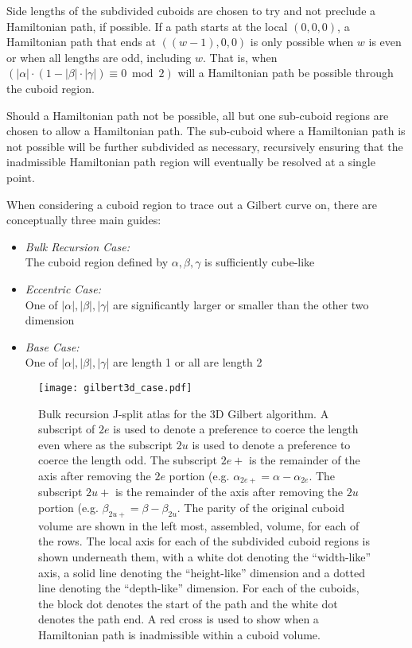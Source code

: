 Side lengths of the subdivided cuboids are chosen to try and not preclude a
Hamiltonian path, if possible.
If a path starts at the local $(0,0,0)$, a Hamiltonian path that ends
at $((w-1),0,0)$ is only possible when $w$ is even or when all lengths are odd, including $w$.
That is, when $(|\alpha| \cdot ( 1 - |\beta| \cdot |\gamma| ) \equiv 0 \bmod 2)$ will a Hamiltonian
path be possible through the cuboid region.

Should a Hamiltonian path not be possible, all but one sub-cuboid regions are chosen to allow a Hamiltonian
path.
The sub-cuboid where a Hamiltonian path is not possible will be further subdivided as necessary, recursively
ensuring that the inadmissible Hamiltonian path region will eventually be resolved at a single point.

When considering a cuboid region to trace out a Gilbert curve on, there are conceptually three main guides:

\begin{itemize}
  \item \textit{Bulk Recursion Case:} \\ The cuboid region defined by $\alpha, \beta, \gamma$ is sufficiently cube-like
  \item \textit{Eccentric Case:} \\ One of $|\alpha|, |\beta|, |\gamma|$ are significantly larger or smaller than the other two dimension
  \item \textit{Base Case:} \\ One of $|\alpha|, |\beta|, |\gamma|$ are length 1 or all are length 2
\end{itemize}


\begin{figure*}[ht]
  \centering
  \texttt{[image: gilbert3d\_case.pdf]}
  \caption{ Bulk recursion J-split atlas for the 3D Gilbert algorithm. A subscript of $2e$ is used to denote a preference
  to coerce the length even where as the subscript $2u$ is used to denote a preference to coerce the length odd.
  The subscript $2e+$ is the remainder of the axis after removing the $2e$ portion (e.g. $\alpha_{2e+} = \alpha - \alpha_{2e}$.
  The subscript $2u+$ is the remainder of the axis after removing the $2u$ portion (e.g. $\beta_{2u+} = \beta - \beta_{2u}$.
  The parity of the original cuboid volume are shown in the left most, assembled, volume, for each of the rows.
  The local axis for each of the subdivided cuboid regions is shown underneath them, with a white dot
  denoting the ``width-like'' axis, a solid line denoting the ``height-like'' dimension and a dotted line
  denoting the ``depth-like'' dimension. For each of the cuboids, the block dot denotes the start of the path
  and the white dot denotes the path end. A red cross is used to show when a Hamiltonian path is inadmissible within a cuboid volume.  }
  \label{fig:gilbert3DCase}
\end{figure*}


